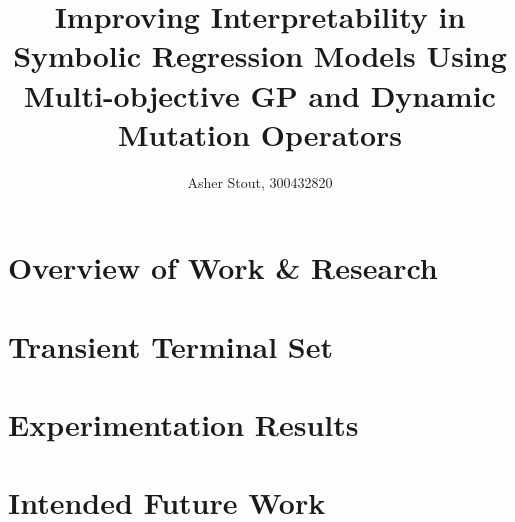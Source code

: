 \documentclass[a4paper]{article}
\title{Improving Interpretability in Symbolic Regression Models Using Multi-objective GP and Dynamic Mutation Operators}
\author{Asher Stout, 300432820}
\begin{document}
\maketitle

\section{Overview of Work \& Research}

\section{Transient Terminal Set}

\section{Experimentation Results}

\section{Intended Future Work}
\end{document}
